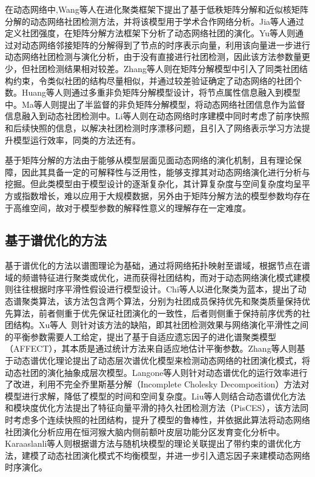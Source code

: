在动态网络中,Wang等人\cite{wang2010low}在进化聚类框架下提出了基于低秩矩阵分解和近似核矩阵分解的动态网络社团检测方法，并将该模型用于学术合作网络分析。Jia等人\cite{jia2014analysis}通过定义社团强度，在矩阵分解方法框架下分析了动态网络社团的演化。Yu等人\cite{yu2017temporally}则通过对动态网络邻接矩阵的分解得到了节点的时序表示向量，利用该向量进一步进行动态网络社团检测与演化分析，由于没有直接进行社团检测，因此该方法参数量更少，但社团检测结果相对较差。Zhang等人\cite{zhang2012common}则在矩阵分解模型中引入了同类社团结构约束，令类似社团的结构尽量相似，并通过较差验证确定了动态网络的社团个数。Huang等人\cite{huang2016clustering}则通过多重非负矩阵分解模型设计，将节点属性信息融入到模型中。Ma等人\cite{ma2017evolutionary}则提出了半监督的非负矩阵分解模型，将动态网络社团信息作为监督信息融入到动态社团检测中。Li等人\cite{li2021detecting}则在动态网络时序建模中同时考虑了前序快照和后续快照的信息，以解决社团检测时序漂移问题，且引入了网络表示学习方法提升模型运行效率，同类的方法还有\cite{li2021identification}。

基于矩阵分解的方法由于能够从模型层面见面动态网络的演化机制，且有理论保障，因此其具备一定的可解释性与泛用性，能够支撑其对动态网络演化进行分析与挖掘。但此类模型由于模型设计的逐渐复杂化，其计算复杂度与空间复杂度均呈平方或指数增长，难以应用于大规模数据，另外由于矩阵分解方法的模型参数均存在于高维空间，故对于模型参数的解释性意义的理解存在一定难度。

\subsection{基于谱优化的方法}
基于谱优化的方法以谱图理论为基础，通过将网络拓扑映射至谱域，根据节点在谱域的频谱特征进行聚类或优化，进而获得社团结构，而对于动态网络演化模式建模则往往根据时序平滑性假设进行模型设计。Chi等人\cite{chi2007evolutionary}以进化聚类为蓝本，提出了动态谱聚类算法，该方法包含两个算法，分别为社团成员保持优先和聚类质量保持优先算法，前者侧重于优先保证社团演化的一致性，后者则侧重于保持前序优秀的社团结构。Xu等人~\cite{xu2014adaptive}则针对该方法的缺陷，即其社团检测效果与网络演化平滑性之间的平衡参数需要人工给定，提出了基于自适应遗忘因子的进化谱聚类模型（AFFECT），其本质是通过统计方法来自适应地估计平衡参数。Zhang等人\cite{zhang2016dynamic}则基于动态谱优化理论提出了动态层次谱优化模型来检测动态网络的社团演化模式，将动态社团的演化抽象成层次模型。Langone等人\cite{langone2016efficient}则针对动态谱优化的运行效率进行了改进，利用不完全乔里斯基分解（Incomplete Cholesky Decomposition）方法对模型进行求解，降低了模型的时间和空间复杂度。Liu等人\cite{liu2018global}则结合动态谱优化方法和模块度优化方法提出了特征向量平滑的持久社团检测方法（PisCES），该方法同时考虑多个连续快照的社团结构，提升了模型的鲁棒性，并依据此算法将动态网络社团演化分析应用在恒河猴大脑内侧前额叶皮层功能分区发育变化分析中。Karaaslanli等人\cite{karaaslanli2020constrained}则根据谱方法与随机块模型的理论关联提出了带约束的谱优化方法，建模了动态社团演化模式不均衡模型，并进一步引入遗忘因子来建模动态网络时序演化\cite{karaaslanli2021community}。

